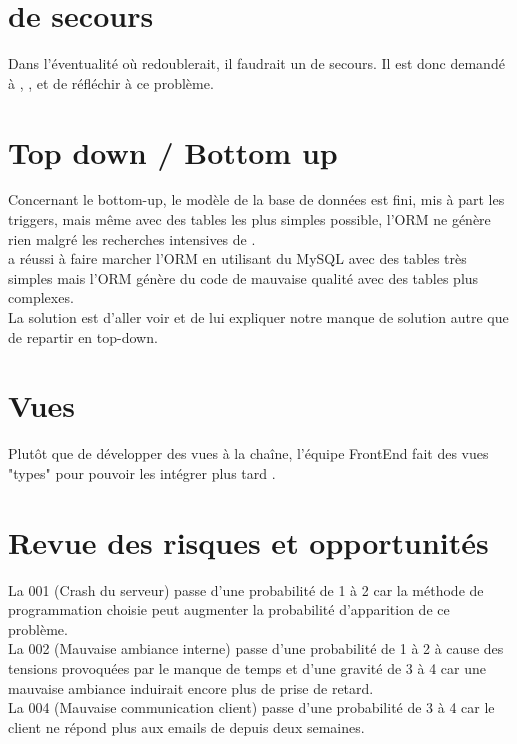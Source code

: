 \documentclass [a4paper] {article}
\begin{document}
\section{\CP{} de secours}
Dans l'éventualité où \Pierre{} redoublerait, il faudrait un \CP{} de secours. Il est donc demandé à \Florian, \Melissa, \Matthieu{} et \Julie{} de réfléchir à ce problème.


\section{Top down / Bottom up}
Concernant le bottom-up, le modèle de la base de données est fini, mis à part les triggers, mais même avec des tables les plus simples possible, l'ORM ne génère rien malgré les recherches intensives de \Michel. \\
\Kafui{} a réussi à faire marcher l'ORM en utilisant du MySQL avec des tables très simples mais l'ORM génère du code de mauvaise qualité avec des tables plus complexes. \\
La solution est d'aller voir \nomTuteurPedago{} et de lui expliquer notre manque de solution autre que de repartir en top-down.


\section{Vues}
Plutôt que de développer des vues à la chaîne, l'équipe FrontEnd fait des vues "types" pour pouvoir les intégrer plus tard . 


\section{Revue des risques et opportunités}

La \FDR{} 001 (Crash du serveur) passe d'une probabilité de 1 à 2 car la méthode de programmation choisie peut augmenter la probabilité d'apparition de ce problème. \\

La \FDR{} 002 (Mauvaise ambiance interne) passe d'une probabilité de 1 à 2 à cause des tensions provoquées par le manque de temps et d'une gravité de 3 à 4 car une mauvaise ambiance induirait encore plus de prise de retard.\\

La \FDR{} 004 (Mauvaise communication client) passe d'une probabilité de 3 à 4 car le client ne répond plus aux emails de \Sergi{} depuis deux semaines.\\
\end{document}
